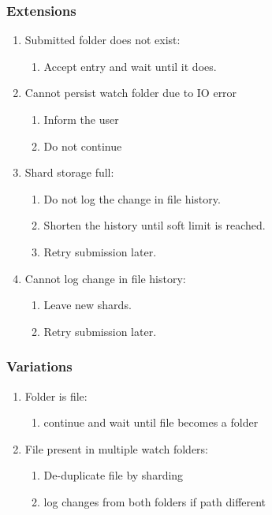 \documentclass[11pt, a4paper, twocolumn, twoside]{report}
\begin{document}
\subsubsection{Extensions}
\begin{enumerate}
  \item Submitted folder does not exist:
	\begin{enumerate}
	  \item Accept entry and wait until it does.
	\end{enumerate}
  \item Cannot persist watch folder due to IO error
	\begin{enumerate}
	  \item Inform the user
	  \item Do not continue
	\end{enumerate}
  \item Shard storage full:
	\begin{enumerate}
	  \item Do not log the change in file history.
	  \item Shorten the history until soft limit is reached.
	  \item Retry submission later.
	\end{enumerate}
  \item Cannot log change in file history:
	\begin{enumerate}
	  \item Leave new shards.
	  \item Retry submission later.
	\end{enumerate}
\end{enumerate}


\subsubsection{Variations}
\begin{enumerate}
  \item Folder is file:
	\begin{enumerate}
	  \item continue and wait until file becomes a folder
	\end{enumerate}
  \item File present in multiple watch folders:
	\begin{enumerate}
	  \item De-duplicate file by sharding
	  \item log changes from both folders if path different
	\end{enumerate}
\end{enumerate}
\end{document}
